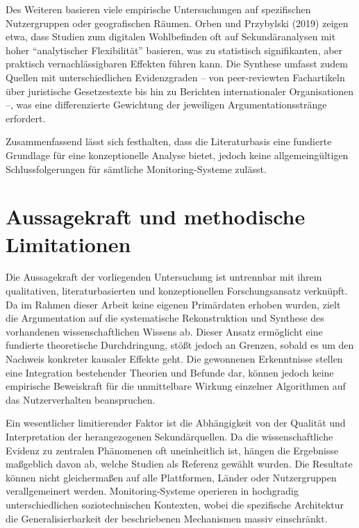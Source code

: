 Des Weiteren basieren viele empirische Untersuchungen auf spezifischen Nutzergruppen oder geografischen Räumen. Orben und Przybylski (2019) zeigen etwa, dass Studien zum digitalen Wohlbefinden oft auf Sekundäranalysen mit hoher \enquote{analytischer Flexibilität} basieren, was zu statistisch signifikanten, aber praktisch vernachlässigbaren Effekten führen kann. Die Synthese umfasst zudem Quellen mit unterschiedlichen Evidenzgraden -- von peer-reviewten Fachartikeln über juristische Gesetzestexte bis hin zu Berichten internationaler Organisationen --, was eine differenzierte Gewichtung der jeweiligen Argumentationsstränge erfordert.

Zusammenfassend lässt sich festhalten, dass die Literaturbasis eine fundierte Grundlage für eine konzeptionelle Analyse bietet, jedoch keine allgemeingültigen Schlussfolgerungen für sämtliche Monitoring-Systeme zulässt.

\section{Aussagekraft und methodische Limitationen}

Die Aussagekraft der vorliegenden Untersuchung ist untrennbar mit ihrem qualitativen, literaturbasierten und konzeptionellen Forschungsansatz verknüpft. Da im Rahmen dieser Arbeit keine eigenen Primärdaten erhoben wurden, zielt die Argumentation auf die systematische Rekonstruktion und Synthese des vorhandenen wissenschaftlichen Wissens ab. Dieser Ansatz ermöglicht eine fundierte theoretische Durchdringung, stößt jedoch an Grenzen, sobald es um den Nachweis konkreter kausaler Effekte geht. Die gewonnenen Erkenntnisse stellen eine Integration bestehender Theorien und Befunde dar, können jedoch keine empirische Beweiskraft für die unmittelbare Wirkung einzelner Algorithmen auf das Nutzerverhalten beanspruchen.

Ein wesentlicher limitierender Faktor ist die Abhängigkeit von der Qualität und Interpretation der herangezogenen Sekundärquellen. Da die wissenschaftliche Evidenz zu zentralen Phänomenen oft uneinheitlich ist, hängen die Ergebnisse maßgeblich davon ab, welche Studien als Referenz gewählt wurden. Die Resultate können nicht gleichermaßen auf alle Plattformen, Länder oder Nutzergruppen verallgemeinert werden. Monitoring-Systeme operieren in hochgradig unterschiedlichen soziotechnischen Kontexten, wobei die spezifische Architektur die Generalisierbarkeit der beschriebenen Mechanismen massiv einschränkt.

